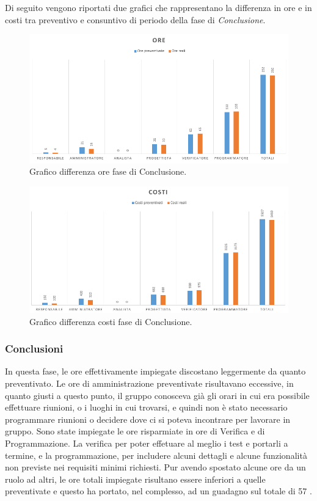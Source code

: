 \documentclass[a4paper]{article}
\begin{document}
				Di seguito vengono riportati due grafici che rappresentano la differenza in ore e in costi tra preventivo e consuntivo di periodo della 
				fase di \emph{Conclusione}.
				\begin{figure}[H]
					\centering
					\includegraphics[width=\textwidth]{diff_h_c}
					\caption{Grafico differenza ore fase di Conclusione.}
				\end{figure}
				\begin{figure}[H]
					\centering
					\includegraphics[width=\textwidth]{diff_c_c}
					\caption{Grafico differenza costi fase di Conclusione.}
				\end{figure}
				
				\subsubsection{Conclusioni}
					In questa fase, le ore effettivamente impiegate discostano leggermente da quanto preventivato. Le ore di amministrazione preventivate 
					risultavano eccessive, in quanto giusti a questo punto, il gruppo conosceva già gli orari in cui era possibile effettuare riunioni, o i 
					luoghi in cui trovarsi, e quindi non è stato necessario programmare riunioni o decidere dove ci si poteva incontrare per lavorare in gruppo.
					Sono state impiegate le ore risparmiate in ore di Verifica e di Programmazione. La verifica per poter effetuare al meglio i test e portarli 
					a termine, e la programmazione, per includere alcuni dettagli e alcune funzionalità non previste nei requisiti minimi richiesti.
					Pur avendo spostato alcune ore da un ruolo ad altri, le ore totali impiegate risultano essere inferiori a quelle preventivate e questo ha 
					portato, nel complesso, ad un guadagno sul totale di 57 \eurosym .
\end{document}
